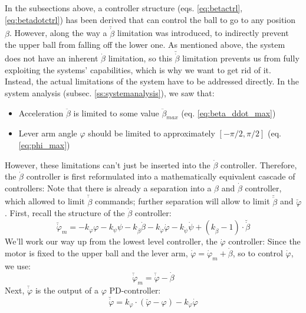 \documentclass{article}
\begin{document}
In the subsections above, a controller structure (eqs. \ref{eq:betactrl}, \ref{eq:betadotctrl}) has been derived that can control the ball to go to any position $\beta$.
However, along the way a $\breve{\dot{\beta}}$ limitation was introduced, to indirectly prevent the upper ball from falling off the lower one.
As mentioned above, the system does not have an inherent $\dot{\beta}$ limitation, so this $\breve{\dot{\beta}}$ limitation prevents us from fully exploiting the systems' capabilities, which is why we want to get rid of it.
Instead, the actual limitations of the system have to be addressed directly.
In the system analysis (subsec. \ref{ss:systemanalysis}), we saw that:
\begin{itemize}
	\item Acceleration $\ddot{\beta}$ is limited to some value $\ddot{\beta}_{max}$ (eq. \ref{eq:beta_ddot_max})
	\item Lever arm angle $\varphi$ should be limited to approximately $[-\pi/2, \pi/2]$ (eq. \ref{eq:phi_max})
\end{itemize}
However, these limitations can't just be inserted into the $\dot{\beta}$ controller.
Therefore, the $\dot{\beta}$ controller is first reformulated into a mathematically equivalent cascade of controllers:
Note that there is already a separation into a $\beta$ and $\dot{\beta}$ controller, which allowed to limit $\breve{\dot{\beta}}$ commands;
further separation will allow to limit $\breve{\ddot{\beta}}$ and $\breve{\varphi}$.
First, recall the structure of the $\dot{\beta}$ controller:
\begin{equation}
\breve{\dot{\varphi}}_m=- k_{\varphi} \varphi - k_{\psi}\psi - k_{\dot{\beta}}\dot{\beta} - k_{\dot{\varphi}} \dot{\varphi} - k_{\dot{\psi}} \dot{\psi} + \left(k_{\dot{\beta}} - 1 \right) \cdot \breve{\dot{\beta}}
\label{eq:betadotctrl2}
\end{equation}
We'll work our way up from the lowest level controller, the $\dot{\varphi}$ controller:
Since the motor is fixed to the upper ball and the lever arm, $\dot{\varphi} = \dot{\varphi}_m + \dot{\beta}$, so to control $\dot{\varphi}$, we use:
\begin{equation}
\breve{\dot{\varphi}}_m = \breve{\dot{\varphi}} - \dot{\beta}
\end{equation}
Next, $\breve{\dot{\varphi}}$ is the output of a $\varphi$ PD-controller:
\begin{equation}
\breve{\dot{\varphi}} = k_{\varphi} \cdot \left( \breve{\varphi} - \varphi \right) - k_{\dot{\varphi}} \dot{\varphi}
\end{equation}
\end{document}
